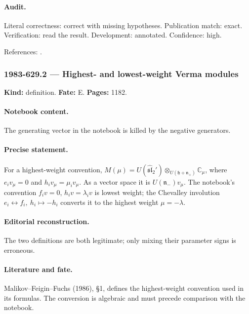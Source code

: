 \paragraph{Audit.} Literal correctness: correct with missing hypotheses. Publication match: exact. Verification: read the result. Development: annotated. Confidence: high.

\noindent References: \citep{malikovfeiginfuchs1986singular}.\par

\subsubsection{1983-629.2 --- Highest- and lowest-weight Verma modules}

\label{item:1983-629.2}

\noindent\textbf{Kind:} definition. \textbf{Fate:} E. \textbf{Pages:} 1182.\par

\paragraph{Notebook content.} The generating vector in the notebook is killed by the negative generators.

\paragraph{Precise statement.} For a highest-weight convention, \(M(\mu)=U(\widehat{\mathfrak{sl}}_2')\otimes_{U(\mathfrak h+\mathfrak n_+)}\mathbb C_\mu\), where \(e_i v_\mu=0\) and \(h_i v_\mu=\mu_i v_\mu\). As a vector space it is \(U(\mathfrak n_-)v_\mu\). The notebook’s convention \(f_i v=0\), \(h_i v=\lambda_i v\) is lowest weight; the Chevalley involution \(e_i\leftrightarrow f_i,\ h_i\mapsto-h_i\) converts it to the highest weight \(\mu=-\lambda\).

\paragraph{Editorial reconstruction.} The two definitions are both legitimate; only mixing their parameter signs is erroneous.

\paragraph{Literature and fate.} Malikov–Feigin–Fuchs (1986), \S1, defines the highest-weight convention used in its formulas. The conversion is algebraic and must precede comparison with the notebook.

